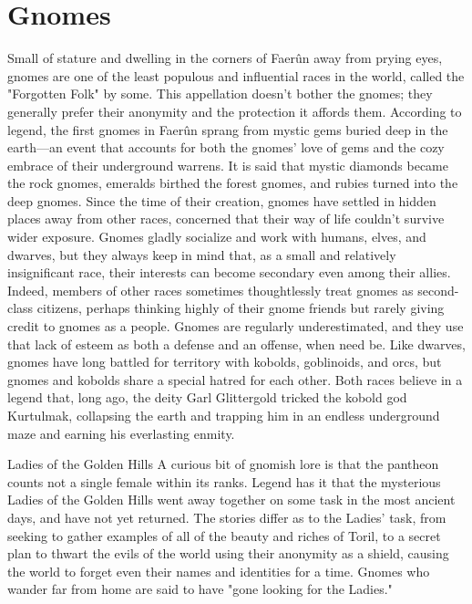 \documentclass[10pt,a4paper,twoside,twocolumn,openany,bg=print,nodeprecatedcode]{dndbook}
\begin{document}
\section{Gnomes}
Small of stature and dwelling in the corners of Faerûn away from prying eyes, gnomes are one of the least populous and influential races in the world, called the "Forgotten Folk" by some. This appellation doesn't bother the gnomes; they generally prefer their anonymity and the protection it affords them.
According to legend, the first gnomes in Faerûn sprang from mystic gems buried deep in the earth—an event that accounts for both the gnomes' love of gems and the cozy embrace of their underground warrens. It is said that mystic diamonds became the rock gnomes, emeralds birthed the forest gnomes, and rubies turned into the deep gnomes. Since the time of their creation, gnomes have settled in hidden places away from other races, concerned that their way of life couldn't survive wider exposure.
Gnomes gladly socialize and work with humans, elves, and dwarves, but they always keep in mind that, as a small and relatively insignificant race, their interests can become secondary even among their allies. Indeed, members of other races sometimes thoughtlessly treat gnomes as second-class citizens, perhaps thinking highly of their gnome friends but rarely giving credit to gnomes as a people. Gnomes are regularly underestimated, and they use that lack of esteem as both a defense and an offense, when need be.
Like dwarves, gnomes have long battled for territory with kobolds, goblinoids, and orcs, but gnomes and kobolds share a special hatred for each other. Both races believe in a legend that, long ago, the deity Garl Glittergold tricked the kobold god Kurtulmak, collapsing the earth and trapping him in an endless underground maze and earning his everlasting enmity.
\begin{DndComment}{Ladies of the Golden Hills}
A curious bit of gnomish lore is that the pantheon counts not a single female within its ranks. Legend has it that the mysterious Ladies of the Golden Hills went away together on some task in the most ancient days, and have not yet returned. The stories differ as to the Ladies' task, from seeking to gather examples of all of the beauty and riches of Toril, to a secret plan to thwart the evils of the world using their anonymity as a shield, causing the world to forget even their names and identities for a time. Gnomes who wander far from home are said to have "gone looking for the Ladies."
\end{DndComment}
\end{document}
